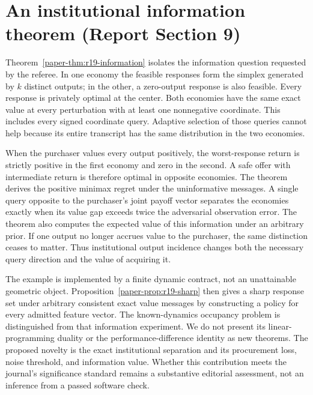 \section{An institutional information theorem (Report Section 9)}
Theorem~\ref{paper-thm:r19-information} isolates the information question requested by the referee. In one economy the feasible responses form the simplex generated by $k$ distinct outputs; in the other, a zero-output response is also feasible. Every response is privately optimal at the center. Both economies have the same exact value at every perturbation with at least one nonnegative coordinate. This includes every signed coordinate query. Adaptive selection of those queries cannot help because its entire transcript has the same distribution in the two economies.

When the purchaser values every output positively, the worst-response return is strictly positive in the first economy and zero in the second. A safe offer with intermediate return is therefore optimal in opposite economies. The theorem derives the positive minimax regret under the uninformative messages. A single query opposite to the purchaser's joint payoff vector separates the economies exactly when its value gap exceeds twice the adversarial observation error. The theorem also computes the expected value of this information under an arbitrary prior. If one output no longer accrues value to the purchaser, the same distinction ceases to matter. Thus institutional output incidence changes both the necessary query direction and the value of acquiring it.

The example is implemented by a finite dynamic contract, not an unattainable geometric object. Proposition~\ref{paper-prop:r19-sharp} then gives a sharp response set under arbitrary consistent exact value messages by constructing a policy for every admitted feature vector. The known-dynamics occupancy problem is distinguished from that information experiment. We do not present its linear-programming duality or the performance-difference identity as new theorems. The proposed novelty is the exact institutional separation and its procurement loss, noise threshold, and information value. Whether this contribution meets the journal's significance standard remains a substantive editorial assessment, not an inference from a passed software check.


